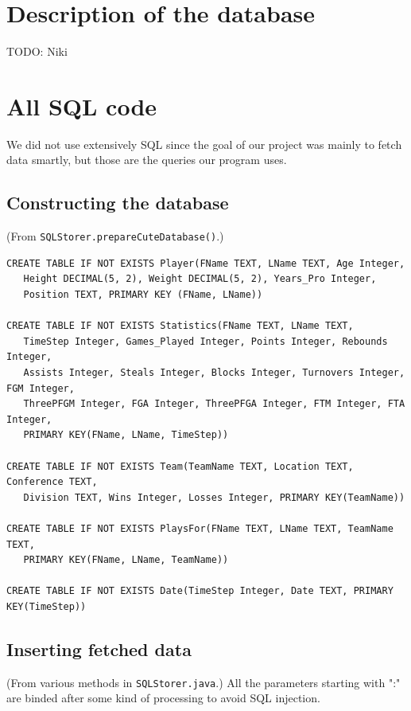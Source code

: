 \documentclass[paper=A4, fontsize=11pt]{scrartcl} %
\begin{document}
\section{Description of the database}
TODO: Niki

\newpage

\section{All SQL code}
We did not use extensively SQL since the goal of our project was mainly to fetch data smartly, but those are the queries our program uses.

\subsection{Constructing the database}
(From \verb!SQLStorer.prepareCuteDatabase()!.)

\begin{verbatim}
CREATE TABLE IF NOT EXISTS Player(FName TEXT, LName TEXT, Age Integer,
   Height DECIMAL(5, 2), Weight DECIMAL(5, 2), Years_Pro Integer, 
   Position TEXT, PRIMARY KEY (FName, LName))
        
CREATE TABLE IF NOT EXISTS Statistics(FName TEXT, LName TEXT,
   TimeStep Integer, Games_Played Integer, Points Integer, Rebounds Integer,
   Assists Integer, Steals Integer, Blocks Integer, Turnovers Integer, FGM Integer,
   ThreePFGM Integer, FGA Integer, ThreePFGA Integer, FTM Integer, FTA Integer,
   PRIMARY KEY(FName, LName, TimeStep))
        
CREATE TABLE IF NOT EXISTS Team(TeamName TEXT, Location TEXT, Conference TEXT,
   Division TEXT, Wins Integer, Losses Integer, PRIMARY KEY(TeamName))
        
CREATE TABLE IF NOT EXISTS PlaysFor(FName TEXT, LName TEXT, TeamName TEXT,
   PRIMARY KEY(FName, LName, TeamName))
        
CREATE TABLE IF NOT EXISTS Date(TimeStep Integer, Date TEXT, PRIMARY KEY(TimeStep))
\end{verbatim}

\subsection{Inserting fetched data}
(From various methods in \verb!SQLStorer.java!.) All the parameters starting with ":" are binded after some kind of processing to avoid SQL injection.
\end{document}
